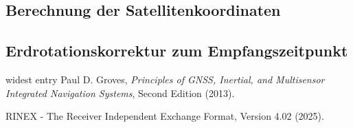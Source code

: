 \documentclass[10pt,a4paper]{article}
\begin{document}
\subsection{Berechnung der Satellitenkoordinaten}

\subsection{Erdrotationskorrektur zum Empfangszeitpunkt}

\begin{thebibliography}{widest entry}
	 Paul D. Groves,
	\textit{Principles of GNSS, Inertial, and Multisensor Integrated Navigation Systems}, Second Edition (2013).
	
	 RINEX - The Receiver Independent Exchange Format, Version 4.02 (2025).

\end{thebibliography}
\end{document}
